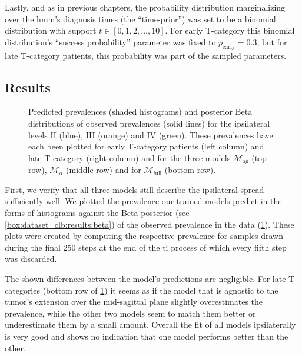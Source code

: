 \documentclass[\relativeRoot/main.tex]{subfiles}
\begin{document}
Lastly, and as in previous chapters, the probability distribution marginalizing over the \gls{hmm}'s diagnosis times (the ``time-prior'') was set to be a binomial distribution with support $t \in [0, 1, 2, \ldots, 10]$. For early T-category this binomial distribution's ``success probability'' parameter was fixed to $p_\text{early} = 0.3$, but for late T-category patients, this probability was part of the sampled parameters.

\subsection{Results}
\label{subsec:bilateral:model_comp:results}

\begin{figure}
    \def\svgwidth{1.0\textwidth}
    
    \caption[
        Comparison of ipsilateral prevalences
    ]{
        Predicted prevalences (shaded histograms) and posterior Beta distributions of observed prevalences (solid lines) for the ipsilateral levels II (blue), III (orange) and IV (green). These prevalences have each been plotted for early T-category patients (left column) and late T-category (right column) and for the three models $\mathcal{M}_\text{ag}$ (top row), $\mathcal{M}_\alpha$ (middle row) and for $\mathcal{M}_\text{full}$ (bottom row).
    }
    \label{fig:bilateral:model_comp:ipsi}
\end{figure}

First, we verify that all three models still describe the ipsilateral spread sufficiently well. We plotted the prevalence our trained models predict in the forms of histograms against the Beta-posterior (see \cref{box:dataset_clb:results:beta}) of the observed prevalence in the data (\cref{fig:bilateral:model_comp:ipsi}). These plots were created by computing the respective prevalence for samples drawn during the final 250 steps at the end of the \gls{ti} process of which every fifth step was discarded.

The shown differences between the model's predictions are negligible. For late T-categories (bottom row of \cref{fig:bilateral:model_comp:ipsi}) it seems as if the model that is agnostic to the tumor's extension over the mid-sagittal plane slightly overestimates the prevalence, while the other two models seem to match them better or underestimate them by a small amount. Overall the fit of all models ipsilaterally is very good and shows no indication that one model performs better than the other.
\end{document}
